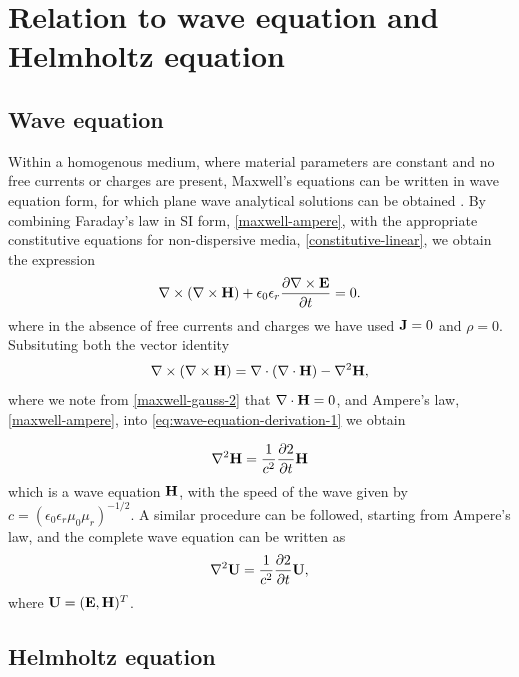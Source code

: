 \section{Relation to wave equation and Helmholtz equation}
%
\subsection{Wave equation}

Within a homogenous medium, where material parameters are constant and no free currents or charges are present, Maxwell's equations can be written in wave equation form, for which plane wave analytical solutions can be obtained \cite{Jackson:490457}. By combining Faraday's law in SI form, \eqref{maxwell-ampere}, with the appropriate constitutive equations for non-dispersive media, \eqref{constitutive-linear}, we obtain the expression
\begin{equation}
\label{eq:wave-equation-derivation-1}
\nabla \times ( \nabla \times \mathbf{H} ) + \epsilon_0 \epsilon_r \frac{\partial  \nabla \times \mathbf{E} }{\partial t} = 0 .
\end{equation}
where in the absence of free currents and charges we have used $\mathbf{J} = 0$ and $\rho = 0$.
Subsituting both the vector identity
$$
\nabla \times ( \nabla \times \mathbf{H} ) = \nabla \cdot ( \nabla \cdot \mathbf{H} ) - \nabla^2 \mathbf{H},
$$
where we note from \eqref{maxwell-gauss-2} that $\nabla \cdot \mathbf{H} = 0$, and Ampere's law, \eqref{maxwell-ampere}, into \eqref{eq:wave-equation-derivation-1} we obtain

\begin{equation}
\label{maxwell-wave-eqtn-E}
    \nabla^2 \mathbf{H} = \frac{1}{c^2} \frac{\partial 2}{\partial t}{ \mathbf{H} }
\end{equation}
which is a wave equation $\mathbf{H}$, with the speed of the wave given by $c = (\epsilon_0 \epsilon_r \mu_0 \mu_r )^{-1/2}$. A similar procedure can be followed, starting from Ampere's law, and the complete wave equation can be written as
\begin{equation}
\label{maxwell-wave-eqtn-E}
    \nabla^2 \mathbf{U} = \frac{1}{c^2} \frac{\partial 2}{\partial t}{ \mathbf{U} } ,
\end{equation}
where $\mathbf{U} = ( \mathbf{E}, \mathbf{H} )^T$.


\subsection{Helmholtz equation}

